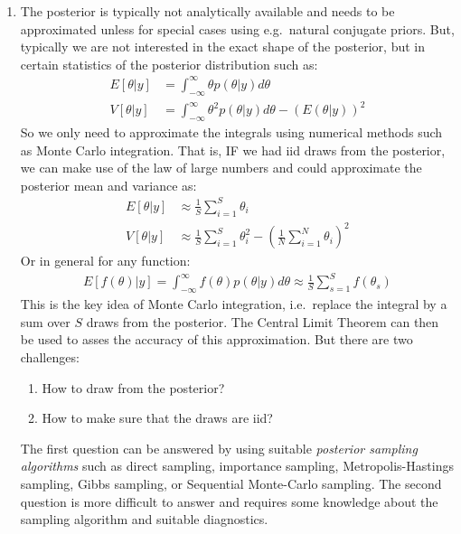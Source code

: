 \begin{enumerate}
\item The posterior is typically not analytically available and needs to be approximated
unless for special cases using e.g.\ natural conjugate priors.
But, typically we are not interested in the exact shape of the posterior,
but in certain statistics of the posterior distribution such as:
\begin{align*}
E[\theta|y] &= \int_{-\infty}^{\infty} \theta p(\theta|y) d\theta
\\
V[\theta|y] &= \int_{-\infty}^{\infty} \theta^2 p(\theta|y) d\theta - (E(\theta|y))^2
\end{align*}
So we only need to approximate the integrals using numerical methods such as Monte Carlo integration.
That is, IF we had iid draws from the posterior, we can make use of the law of large numbers
and could approximate the posterior mean and variance as:
\begin{align*}
E[\theta|y] &\approx \frac{1}{S} \sum_{i=1}^S \theta_i
\\
V[\theta|y] &\approx \frac{1}{S} \sum_{i=1}^S \theta_i^2 - {\left(\frac{1}{N} \sum_{i=1}^N \theta_i\right)}^2
\end{align*}
Or in general for any function:
\begin{align*}
E[f(\theta)|y] = \int_{-\infty}^{\infty} f(\theta) p(\theta|y) d\theta \approx \frac{1}{S} \sum_{s=1}^S f(\theta_s)
\end{align*}
This is the key idea of Monte Carlo integration,
i.e.\ replace the integral by a sum over \(S\) draws from the posterior.
The Central Limit Theorem can then be used to asses the accuracy of this approximation.
But there are two challenges:
\begin{enumerate}
  \item How to draw from the posterior?
  \item How to make sure that the draws are iid?
\end{enumerate}
The first question can be answered by using suitable \emph{posterior sampling algorithms}
such as direct sampling, importance sampling, Metropolis-Hastings sampling, Gibbs sampling, or 
Sequential Monte-Carlo sampling.
The second question is more difficult to answer and requires some knowledge about the sampling algorithm
and suitable diagnostics.
\end{enumerate}